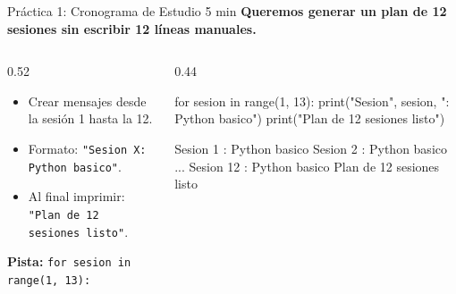 \documentclass[aspectratio=169, 11pt]{beamer}
\begin{document}
\begin{frame}[fragile,shrink=30]{Práctica 1: Cronograma de Estudio \hfill {\normalsize\color{arcaRed}\faClock\hspace{4pt}5 min}}
  \vspace{-6pt}
  {\small\color{arcaDark}\bfseries
    Queremos generar un plan de 12 sesiones sin escribir 12 líneas manuales.}

  \vspace{6pt}
  \begin{columns}[T]
    \begin{column}{0.52\textwidth}
      {\footnotesize\color{textMuted}
      \begin{itemize}\setlength{\itemsep}{4pt}
        \item[{\color{arcaRed}\scriptsize\faArrowRight}]
          Crear mensajes desde la sesión 1 hasta la 12.
        \item[{\color{arcaRed}\scriptsize\faArrowRight}]
          Formato: \texttt{"Sesion X: Python basico"}.
        \item[{\color{arcaRed}\scriptsize\faArrowRight}]
          Al final imprimir:
          \texttt{"Plan de 12 sesiones listo"}.
      \end{itemize}
      }

      \vspace{6pt}
      {\scriptsize\color{textMuted}
        \faLightbulb[regular]\hspace{4pt}\textbf{Pista:}
        \texttt{for sesion in range(1, 13):}}
    \end{column}

    \begin{column}{0.44\textwidth}
      \begin{pyblock}
for sesion in range(1, 13):
    print("Sesion", sesion, ": Python basico")
print("Plan de 12 sesiones listo")
      \end{pyblock}
      \vspace{-2pt}
      \begin{outputblock}
Sesion 1 : Python basico
Sesion 2 : Python basico
...
Sesion 12 : Python basico
Plan de 12 sesiones listo
      \end{outputblock}
    \end{column}
  \end{columns}
\end{frame}
\end{document}
